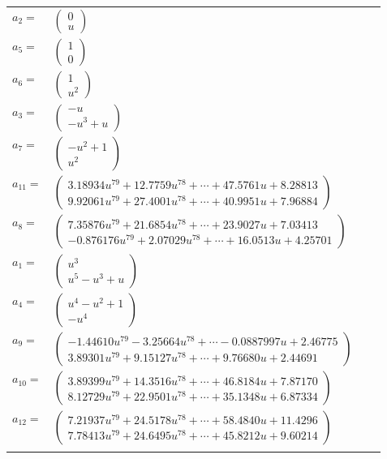\documentclass[1p]{elsarticle_modified}
\theoremstyle{definition}
\begin{document}
\begin{tabular}{m{7pt} m{180pt} m{7pt} m{180pt} }
\flushright $a_{2}=$&$\begin{pmatrix}0\\u\end{pmatrix}$ \\
\flushright $a_{5}=$&$\begin{pmatrix}1\\0\end{pmatrix}$ \\
\flushright $a_{6}=$&$\begin{pmatrix}1\\u^2\end{pmatrix}$ \\
\flushright $a_{3}=$&$\begin{pmatrix}- u\\- u^3+u\end{pmatrix}$ \\
\flushright $a_{7}=$&$\begin{pmatrix}- u^2+1\\u^2\end{pmatrix}$ \\
\flushright $a_{11}=$&$\begin{pmatrix}3.18934 u^{79}+12.7759 u^{78}+\cdots+47.5761 u+8.28813\\9.92061 u^{79}+27.4001 u^{78}+\cdots+40.9951 u+7.96884\end{pmatrix}$ \\
\flushright $a_{8}=$&$\begin{pmatrix}7.35876 u^{79}+21.6854 u^{78}+\cdots+23.9027 u+7.03413\\-0.876176 u^{79}+2.07029 u^{78}+\cdots+16.0513 u+4.25701\end{pmatrix}$ \\
\flushright $a_{1}=$&$\begin{pmatrix}u^3\\u^5- u^3+u\end{pmatrix}$ \\
\flushright $a_{4}=$&$\begin{pmatrix}u^4- u^2+1\\- u^4\end{pmatrix}$ \\
\flushright $a_{9}=$&$\begin{pmatrix}-1.44610 u^{79}-3.25664 u^{78}+\cdots-0.0887997 u+2.46775\\3.89301 u^{79}+9.15127 u^{78}+\cdots+9.76680 u+2.44691\end{pmatrix}$ \\
\flushright $a_{10}=$&$\begin{pmatrix}3.89399 u^{79}+14.3516 u^{78}+\cdots+46.8184 u+7.87170\\8.12729 u^{79}+22.9501 u^{78}+\cdots+35.1348 u+6.87334\end{pmatrix}$ \\
\flushright $a_{12}=$&$\begin{pmatrix}7.21937 u^{79}+24.5178 u^{78}+\cdots+58.4840 u+11.4296\\7.78413 u^{79}+24.6495 u^{78}+\cdots+45.8212 u+9.60214\end{pmatrix}$\\&\end{tabular}
\end{document}
